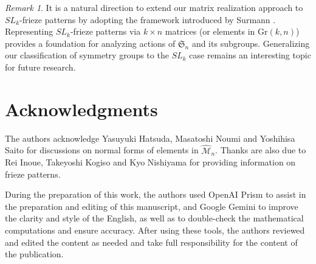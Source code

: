 \documentclass[11pt]{amsart}
\theoremstyle{plain}
\theoremstyle{definition}
\theoremstyle{remark}
\newtheorem{remark}[proposition]{Remark}
\begin{document}
\begin{remark}
It is a natural direction to extend our matrix realization approach to
$SL_k$-frieze patterns by adopting the framework introduced by Surmann
\cite{Surmann2025}. Representing $SL_k$-frieze patterns via $k \times n$
matrices (or elements in $\mathrm{Gr}(k,n)$) provides a foundation for analyzing
actions of $\mathfrak{S}_n$ and its subgroups. Generalizing our classification of
symmetry groups to the $SL_k$ case remains an interesting topic for future
research.
\end{remark}


\section*{Acknowledgments}
The authors acknowledge Yasuyuki Hatsuda, Masatoshi Noumi and Yoshihisa Saito
for discussions on normal forms of elements in $\widehat{\mathcal{M}}_n$. Thanks are also due
to Rei Inoue, Takeyoshi Kogiso and Kyo Nishiyama for providing information on
frieze patterns.

During the preparation of this work, the authors used OpenAI Prism to assist in
the preparation and editing of this manuscript, and Google Gemini to improve
the clarity and style of the English, as well as to double-check the
mathematical computations and ensure accuracy.
After using these tools, the authors reviewed and edited the content as needed
and take full responsibility for the content of the publication.
%
\end{document}
